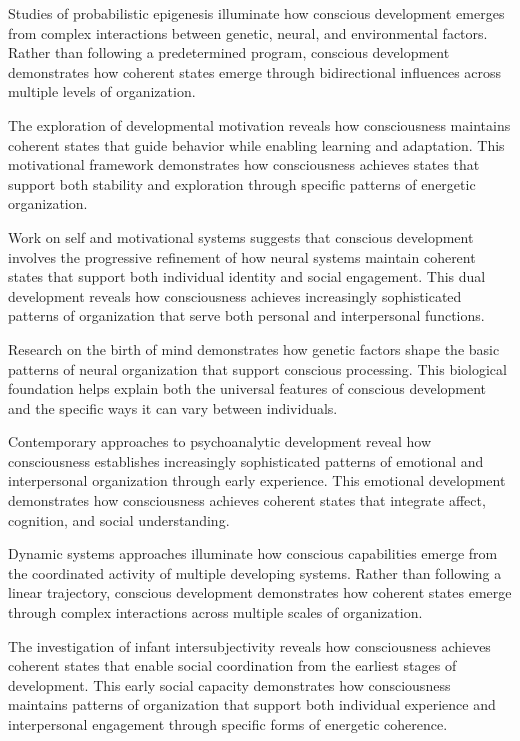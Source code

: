 \begin{refsection}
Studies of probabilistic epigenesis \cite{Gottlieb2007} illuminate how conscious development emerges from complex interactions between genetic, neural, and environmental factors. Rather than following a predetermined program, conscious development demonstrates how coherent states emerge through bidirectional influences across multiple levels of organization.

The exploration of developmental motivation \cite{Kagan2013} reveals how consciousness maintains coherent states that guide behavior while enabling learning and adaptation. This motivational framework demonstrates how consciousness achieves states that support both stability and exploration through specific patterns of energetic organization.

Work on self and motivational systems \cite{Lichtenberg2016} suggests that conscious development involves the progressive refinement of how neural systems maintain coherent states that support both individual identity and social engagement. This dual development reveals how consciousness achieves increasingly sophisticated patterns of organization that serve both personal and interpersonal functions.

Research on the birth of mind \cite{Marcus2004} demonstrates how genetic factors shape the basic patterns of neural organization that support conscious processing. This biological foundation helps explain both the universal features of conscious development and the specific ways it can vary between individuals.

Contemporary approaches to psychoanalytic development \cite{Stern2000} reveal how consciousness establishes increasingly sophisticated patterns of emotional and interpersonal organization through early experience. This emotional development demonstrates how consciousness achieves coherent states that integrate affect, cognition, and social understanding.

Dynamic systems approaches \cite{Thelen1996} illuminate how conscious capabilities emerge from the coordinated activity of multiple developing systems. Rather than following a linear trajectory, conscious development demonstrates how coherent states emerge through complex interactions across multiple scales of organization.

The investigation of infant intersubjectivity \cite{Trevarthen2011} reveals how consciousness achieves coherent states that enable social coordination from the earliest stages of development. This early social capacity demonstrates how consciousness maintains patterns of organization that support both individual experience and interpersonal engagement through specific forms of energetic coherence.


\end{refsection}
